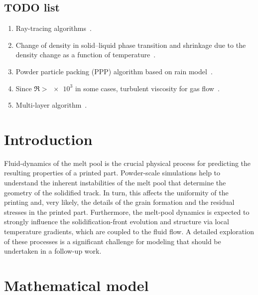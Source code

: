 \documentclass{article}
\begin{document}
\subsection{TODO list}
\begin{enumerate}
    \item Ray-tracing algorithms~\cite{cook2019simulation}.
    \item Change of density in solid--liquid phase transition and shrinkage due to the density change as a function of temperature~\cite{wei2017thermal}.
    \item Powder particle packing (PPP) algorithm based on rain model~\cite{attar2011simulation}.
    \item Since $\Re>\num{e3}$ in some cases, turbulent viscosity for gas flow~\cite{zhirnov2018evaporation,gusarov2020entrainment,matthews2016denudation}.
    \item Multi-layer algorithm~\cite{attar2011simulation}.
\end{enumerate}

\section{Introduction}

Fluid-dynamics of the melt pool is the crucial physical process
for predicting the resulting properties of a printed part.
Powder-scale simulations help to understand the inherent instabilities of the melt pool
that determine the geometry of the solidified track.
In turn, this affects the uniformity of the printing and, very likely, the details of the grain formation
and the residual stresses in the printed part.
Furthermore, the melt-pool dynamics is expected to strongly influence the solidification-front evolution
and structure via local temperature gradients, which are coupled to the fluid flow.
A detailed exploration of these processes is a significant challenge for modeling
that should be undertaken in a follow-up work.

\section{Mathematical model}
\end{document}
